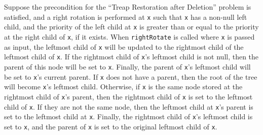 \documentclass[12pt]{article}
\newenvironment{problem}[2][Problem]{\begin{trivlist}
\item[\hskip \labelsep {\bfseries #1}\hskip \labelsep {\bfseries #2.}]}{\end{trivlist}}
\begin{document}
\begin{problem}{7}

Suppose the precondition for the ``Treap Restoration after Deletion'' problem is satisfied, and a right rotation is performed at \texttt{x} such that \texttt{x}
has a non-null left child, and the priority of the left child at \texttt{x} is greater than or equal to the priority at the right child of \texttt{x}, if it
exists. When \texttt{rightRotate} is called where \texttt{x} is passed as input, the leftmost child of \texttt{x} will be updated to the rightmost child of the leftmost
child of \texttt{x}. If the rightmost child of \texttt{x}’s leftmost child is not null, then the parent of this node will be set to \texttt{x}. Finally, the parent of
\texttt{x}’s leftmost child will be set to \texttt{x}’s current parent. If \texttt{x} does not have a parent, then the root of the tree will become \texttt{x}’s leftmost child.
Otherwise, if \texttt{x} is the same node stored at the rightmost child of \texttt{x}’s parent, then the rightmost child of \texttt{x} is set to the leftmost child of \texttt{x}.
If they are not the same node, then the leftmost child at \texttt{x}’s parent is set to the leftmost child at \texttt{x}. Finally, the rightmost child of \texttt{x}’s
leftmost child is set to \texttt{x}, and the parent of \texttt{x} is set to the original leftmost child of \texttt{x}.

\end{problem}
\end{document}
